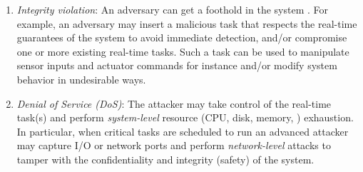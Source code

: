 \documentclass[../rt_server_main.tex]{subfiles}
\begin{document}
\begin{enumerate}[\it i\normalfont )]

\item \textit{Integrity violation}: %
An adversary can get a foothold in the system \cite{cy_side_channel,taskshuffler}. For example, an adversary may insert a malicious task that respects the real-time guarantees of the system to avoid immediate detection, and/or compromise one or more existing real-time tasks. %
Such a task can be used to manipulate sensor inputs and actuator commands for instance and/or modify system behavior in undesirable ways.


\item \textit{Denial of Service (DoS)}: The attacker may take control of the real-time task(s) and perform \textit{system-level} resource (\eg CPU, disk, memory, \etc) exhaustion.  In %
particular, when critical tasks are scheduled to run
an advanced attacker may capture I/O or network ports and perform \textit{network-level} attacks to tamper with the confidentiality and integrity (\viz safety) of the system.

\end{enumerate}
\end{document}

